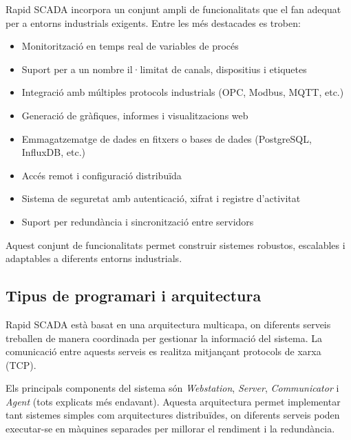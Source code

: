 \documentclass[12pt,a4paper]{report}
\begin{document}
Rapid SCADA incorpora un conjunt ampli de funcionalitats que el fan adequat per a entorns industrials exigents. Entre les més destacades es troben:

\begin{itemize}
    \item Monitorització en temps real de variables de procés
    \item Suport per a un nombre il·limitat de canals, dispositius i etiquetes
    \item Integració amb múltiples protocols industrials (OPC, Modbus, MQTT, etc.)
    \item Generació de gràfiques, informes i visualitzacions web
    \item Emmagatzematge de dades en fitxers o bases de dades (PostgreSQL, InfluxDB, etc.)
    \item Accés remot i configuració distribuïda
    \item Sistema de seguretat amb autenticació, xifrat i registre d'activitat
    \item Suport per redundància i sincronització entre servidors
\end{itemize}

Aquest conjunt de funcionalitats permet construir sistemes robustos, escalables i adaptables a diferents entorns industrials.

\subsection{Tipus de programari i arquitectura}

Rapid SCADA està basat en una arquitectura multicapa, on diferents serveis treballen de manera coordinada per gestionar la informació del sistema. La comunicació entre aquests serveis es realitza mitjançant protocols de xarxa (TCP).

Els principals components del sistema són \textit{Webstation}, \textit{Server}, \textit{Communicator} i \textit{Agent} (tots explicats més endavant). Aquesta arquitectura permet implementar tant sistemes simples com arquitectures distribuïdes, on diferents serveis poden executar-se en màquines separades per millorar el rendiment i la redundància.
\end{document}
